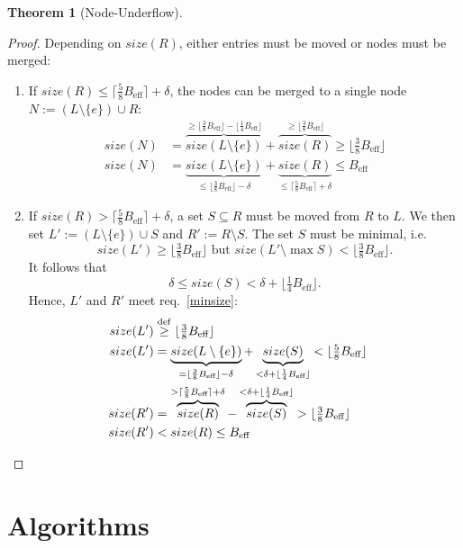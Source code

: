 \documentclass[a4paper, 8pt]{scrartcl}
\theoremstyle{plain}
\theoremstyle{definition}
\newtheorem{thm}{Theorem}[section]
\theoremstyle{remark}
\newcommand \Beff { B_{\text{eff}} }
\begin{document}
\begin{multicols}{2}
\begin{thm}[Node-Underflow]
\begin{proof}
Depending on $size(R)$, either entries must be moved or nodes must be merged:
\begin{enumerate}
\item If \mbox{$size(R) \leq \lceil \frac{5}{8} \Beff \rceil + \delta$},
the nodes can be merged to a single node
\mbox{$N := (L \setminus \{e\}) \cup R$}:
\begin{align*}
size(N)
	&= \overbrace{size(L \setminus \{e\})}^{
			\geq \lfloor \frac{3}{8} \Beff \rfloor 
				- \lfloor \frac{1}{4} \Beff \rfloor}
		+ \overbrace{size(R)}^{
			\geq \lfloor \frac{3}{8} \Beff \rfloor}
	\geq \lfloor \tfrac{3}{8} \Beff \rfloor\\
size(N)
	&= \underbrace{size(L \setminus \{e\})}_{
			\leq \lfloor \frac{3}{8} \Beff \rfloor - \delta}
		+ \underbrace{size(R)}_{
			\leq \lceil \frac{5}{8} \Beff \rceil + \delta}
	\leq \Beff
\end{align*}

\item
If \mbox{$size(R) > \lceil \frac{5}{8} \Beff \rceil + \delta$}, a set
\mbox{$S \subseteq R$} must be moved from $R$ to $L$.
We then set \mbox{$L' := (L \setminus \{e\}) \cup S$} and
\mbox{$R' := R \setminus S$}.
The set $S$ must be minimal, i.e.
\[ size(L') \geq \lfloor \tfrac{3}{8} \Beff \rfloor \text{ but }
	size(L' \setminus \max S) < \lfloor \tfrac{3}{8} \Beff \rfloor. \]
It follows that
\[ \delta \leq size(S) < \delta + \lfloor \tfrac{1}{4} \Beff \rfloor. \]
Hence, $L'$ and $R'$ meet req.~\ref{minsize}:
\begin{align*}
size(L')
	&\stackrel{\mathrm{def}}{\geq} \lfloor \tfrac{3}{8} \Beff \rfloor\\
size(L')
	&= \underbrace{size(L \setminus \{e\})}_{
			= \lfloor \frac{3}{8} \Beff \rfloor - \delta}
		+ \underbrace{size(S)}_{
			< \delta + \lfloor \frac{1}{4} \Beff \rfloor}
	< \lfloor \tfrac{5}{8} \Beff \rfloor\\
size(R')
	&= \overbrace{size(R)}^{
			> \lceil \frac{5}{8} \Beff \rceil + \delta}
		- \overbrace{size(S)}^{
			< \delta + \lfloor \frac{1}{4} \Beff \rfloor}
	> \lfloor \tfrac{3}{8} \Beff \rfloor\\
size(R')
	&< size(R) \leq \Beff                                     &\qedhere
\end{align*}
\end{enumerate}
\end{proof}
\end{thm}



\section{Algorithms} %


\end{multicols}
\end{document}
